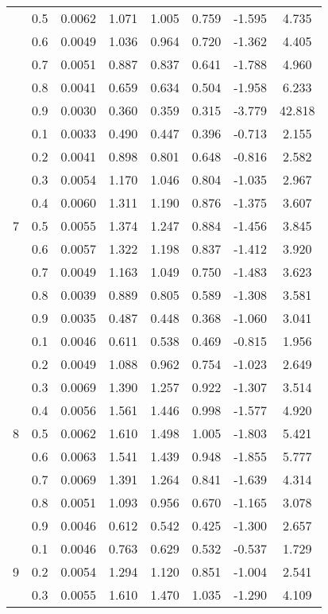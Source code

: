 \documentclass[11pt,a4paper]{report}
\begin{document}
\begin{longtable}{ | c | c || c | c | c | c | c | c | }
 & 0.5 & 0.0062 & 1.071 & 1.005 & 0.759 & -1.595 & 4.735 \\
 & 0.6 & 0.0049 & 1.036 & 0.964 & 0.720 & -1.362 & 4.405 \\
 & 0.7 & 0.0051 & 0.887 & 0.837 & 0.641 & -1.788 & 4.960 \\
 & 0.8 & 0.0041 & 0.659 & 0.634 & 0.504 & -1.958 & 6.233 \\
 & 0.9 & 0.0030 & 0.360 & 0.359 & 0.315 & -3.779 & 42.818 \\
 \hline
\multirow{9}{*}{7} & 0.1 & 0.0033 & 0.490 & 0.447 & 0.396 & -0.713 & 2.155 \\
 & 0.2 & 0.0041 & 0.898 & 0.801 & 0.648 & -0.816 & 2.582 \\
 & 0.3 & 0.0054 & 1.170 & 1.046 & 0.804 & -1.035 & 2.967 \\
 & 0.4 & 0.0060 & 1.311 & 1.190 & 0.876 & -1.375 & 3.607 \\
 & 0.5 & 0.0055 & 1.374 & 1.247 & 0.884 & -1.456 & 3.845 \\
 & 0.6 & 0.0057 & 1.322 & 1.198 & 0.837 & -1.412 & 3.920 \\
 & 0.7 & 0.0049 & 1.163 & 1.049 & 0.750 & -1.483 & 3.623 \\
 & 0.8 & 0.0039 & 0.889 & 0.805 & 0.589 & -1.308 & 3.581 \\
 & 0.9 & 0.0035 & 0.487 & 0.448 & 0.368 & -1.060 & 3.041 \\
 \hline
\multirow{9}{*}{8} & 0.1 & 0.0046 & 0.611 & 0.538 & 0.469 & -0.815 & 1.956 \\
 & 0.2 & 0.0049 & 1.088 & 0.962 & 0.754 & -1.023 & 2.649 \\
 & 0.3 & 0.0069 & 1.390 & 1.257 & 0.922 & -1.307 & 3.514 \\
 & 0.4 & 0.0056 & 1.561 & 1.446 & 0.998 & -1.577 & 4.920 \\
 & 0.5 & 0.0062 & 1.610 & 1.498 & 1.005 & -1.803 & 5.421 \\
 & 0.6 & 0.0063 & 1.541 & 1.439 & 0.948 & -1.855 & 5.777 \\
 & 0.7 & 0.0069 & 1.391 & 1.264 & 0.841 & -1.639 & 4.314 \\
 & 0.8 & 0.0051 & 1.093 & 0.956 & 0.670 & -1.165 & 3.078 \\
 & 0.9 & 0.0046 & 0.612 & 0.542 & 0.425 & -1.300 & 2.657 \\
 \hline
\multirow{9}{*}{9} & 0.1 & 0.0046 & 0.763 & 0.629 & 0.532 & -0.537 & 1.729 \\
 & 0.2 & 0.0054 & 1.294 & 1.120 & 0.851 & -1.004 & 2.541 \\
 & 0.3 & 0.0055 & 1.610 & 1.470 & 1.035 & -1.290 & 4.109 \\

\end{longtable}
\end{document}

